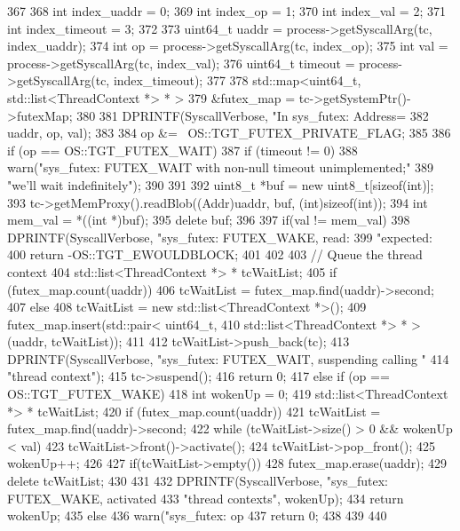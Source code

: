 \begin{DoxyCode}
367 {
368     int index_uaddr = 0;
369     int index_op = 1;
370     int index_val = 2;
371     int index_timeout = 3;
372 
373     uint64_t uaddr = process->getSyscallArg(tc, index_uaddr);
374     int op = process->getSyscallArg(tc, index_op);
375     int val = process->getSyscallArg(tc, index_val);
376     uint64_t timeout = process->getSyscallArg(tc, index_timeout);
377 
378     std::map<uint64_t, std::list<ThreadContext *> * >
379         &futex_map = tc->getSystemPtr()->futexMap;
380 
381     DPRINTF(SyscallVerbose, "In sys_futex: Address=%
382             uaddr, op, val);
383 
384     op &= ~OS::TGT_FUTEX_PRIVATE_FLAG;
385 
386     if (op == OS::TGT_FUTEX_WAIT) {
387         if (timeout != 0) {
388             warn("sys_futex: FUTEX_WAIT with non-null timeout unimplemented;"
389                  "we'll wait indefinitely");
390         }
391 
392         uint8_t *buf = new uint8_t[sizeof(int)];
393         tc->getMemProxy().readBlob((Addr)uaddr, buf, (int)sizeof(int));
394         int mem_val = *((int *)buf);
395         delete buf;
396 
397         if(val != mem_val) {
398             DPRINTF(SyscallVerbose, "sys_futex: FUTEX_WAKE, read: %
399                                     "expected: %
400             return -OS::TGT_EWOULDBLOCK;
401         }
402 
403         // Queue the thread context
404         std::list<ThreadContext *> * tcWaitList;
405         if (futex_map.count(uaddr)) {
406             tcWaitList = futex_map.find(uaddr)->second;
407         } else {
408             tcWaitList = new std::list<ThreadContext *>();
409             futex_map.insert(std::pair< uint64_t,
410                             std::list<ThreadContext *> * >(uaddr, tcWaitList));
411         }
412         tcWaitList->push_back(tc);
413         DPRINTF(SyscallVerbose, "sys_futex: FUTEX_WAIT, suspending calling "
414                                 "thread context\n");
415         tc->suspend();
416         return 0;
417     } else if (op == OS::TGT_FUTEX_WAKE){
418         int wokenUp = 0;
419         std::list<ThreadContext *> * tcWaitList;
420         if (futex_map.count(uaddr)) {
421             tcWaitList = futex_map.find(uaddr)->second;
422             while (tcWaitList->size() > 0 && wokenUp < val) {
423                 tcWaitList->front()->activate();
424                 tcWaitList->pop_front();
425                 wokenUp++;
426             }
427             if(tcWaitList->empty()) {
428                 futex_map.erase(uaddr);
429                 delete tcWaitList;
430             }
431         }
432         DPRINTF(SyscallVerbose, "sys_futex: FUTEX_WAKE, activated %
433                                 "thread contexts\n", wokenUp);
434         return wokenUp;
435     } else {
436         warn("sys_futex: op %
437         return 0;
438     }
439 
440 }
\end{DoxyCode}
